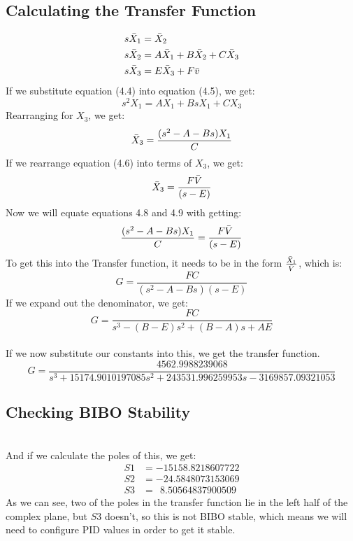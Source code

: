 \subsection*{Calculating the Transfer Function}
\begin{align}
    s\Bar{X}_1 &= \Bar{X}_2
    \\
    s\Bar{{X}}_2 &= A\Bar{X}_1 + 
    B\Bar{X}_2 + C\Bar{X}_3
    \\
    s\Bar{X}_3 &= E\Bar{X}_3 + F\Bar{v}
\end{align}
If we substitute equation (4.4) into equation (4.5), we get:
\begin{equation}
    s^2X_1 = AX_1 + BsX_1 + CX_3
\end{equation}
Rearranging for $X_3 $, we get:
\begin{equation}
    \Bar{X}_3 = \frac{(s^2-A-Bs)X_1}{C}
\end{equation}
If we rearrange equation (4.6) into terms of $X_3 $, we get:
\begin{equation}
    \Bar{X}_3 = \frac{F\Bar{V}}{(s-E)}
\end{equation}
Now we will equate equations 4.8 and 4.9 with getting:
\begin{equation}
    \frac{(s^2-A-Bs)X_1}{C} = \frac{F\Bar{V}}{(s-E)}
\end{equation}
To get this into the Transfer function, it needs to be in the form $\frac{\Bar{X}_1}{\Bar{V}}$, which is:
\begin{equation*}
    G = \frac{FC}{(s^2-A-Bs)(s - E)}
\end{equation*}
If we expand out the denominator, we get:
\begin{equation}
    G = \frac{FC}{s^3 - (B - E)s^2 +(B-A)s + AE}
\end{equation}
\\
If we now substitute our constants into this, we get the transfer function.
\begin{equation}
    G =\frac{4562.9988239068}{s^3 + 15174.9010197085s^2 + 243531.996259953s - 3169857.09321053}
\end{equation}
\subsection*{Checking BIBO Stability} \hfill \\
And if we calculate the poles of this, we get:
\begin{align}
    S1 &= -15158.8218607722
    \\
    S2 &= -24.5848073153069
    \\
    S3 &=\ \ 8.50564837900509
\end{align}
As we can see, two of the poles in the transfer function lie in the left half of the complex plane, but $S3 $ doesn't, so this is not BIBO stable, which means we will need to configure PID values in order to get it stable.
